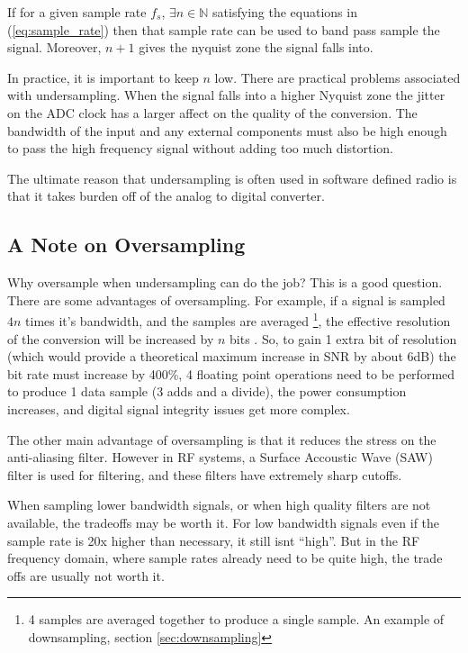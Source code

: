 \documentclass[a4paper, 12pt]{article}
\begin{document}
If for a given sample rate $f_s$, $\exists n \in \mathbb{N}$ satisfying the equations in (\ref{eq:sample_rate}) then that sample rate can be used to band pass sample the signal.  Moreover, $n+1$ gives the nyquist zone the signal falls into.

In practice, it is important to keep $n$ low.  There are practical problems associated with undersampling.  When the signal falls into a higher Nyquist zone the jitter on the ADC clock has a larger affect on the quality of the conversion.  The bandwidth of the input and any external components must also be high enough to pass the high frequency signal without adding too much distortion.

The ultimate reason that undersampling is often used in software defined radio is that it takes burden off of the analog to digital converter.

\subsection{A Note on Oversampling}
Why oversample when undersampling can do the job\cite{why_oversample}?  This is a good question.  There are some advantages of oversampling.  For example, if a signal is sampled $4n$ times it's bandwidth, and the samples are averaged \footnote{4 samples are averaged together to produce a single sample.  An example of downsampling, section \ref{sec:downsampling}}, the effective resolution of the conversion will be increased by $n$ bits \cite{oversample_extra_bits}.  So, to gain 1 extra bit of resolution (which would provide a theoretical maximum increase in SNR by about 6dB) the bit rate must increase by 400\%, 4 floating point operations need to be performed to produce 1 data sample (3 adds and a divide), the power consumption increases, and digital signal integrity issues get more complex.

The other main advantage of oversampling is that it reduces the stress on the anti-aliasing filter.  However in RF systems, a Surface Accoustic Wave (SAW) filter is used for filtering, and these filters have extremely sharp cutoffs.

When sampling lower bandwidth signals, or when high quality filters are not available, the tradeoffs may be worth it.  For low bandwidth signals even if the sample rate is 20x higher than necessary, it still isnt ``high''.  But in the RF frequency domain, where sample rates already need to be quite high, the trade offs are usually not worth it.
\end{document}
